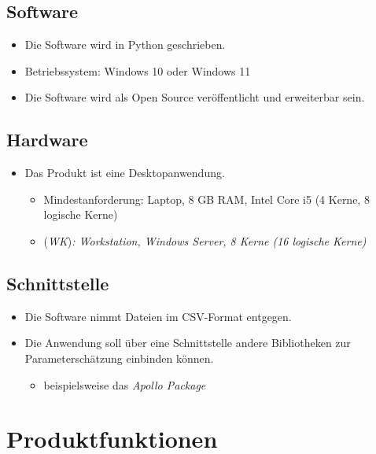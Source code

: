 \documentclass{article}
\begin{document}
\subsection{Software}
\begin{itemize}
    \item Die Software wird in Python geschrieben.
    \item Betriebssystem: Windows 10 oder Windows 11
    \item Die Software wird als Open Source veröffentlicht und erweiterbar sein.
\end{itemize}
\subsection{Hardware}
\begin{itemize}
    \item Das Produkt ist eine Desktopanwendung.
    \begin{itemize}
        \item Mindestanforderung: Laptop, 8 GB RAM, Intel Core i5 (4 Kerne, 8 logische Kerne)
        \item (\textit{WK})\textit{: Workstation, Windows Server, 8 Kerne (16 logische Kerne)}
    \end{itemize}
\end{itemize}
\subsection{Schnittstelle}
\begin{itemize}
    \item Die Software nimmt Dateien im CSV-Format entgegen.
    \item Die Anwendung soll über eine Schnittstelle andere Bibliotheken zur Parameterschätzung einbinden können.
    \begin{itemize}
        \item beispielsweise das \textit{Apollo Package}
    \end{itemize}
\end{itemize}

\clearpage
\section{Produktfunktionen}
\end{document}
